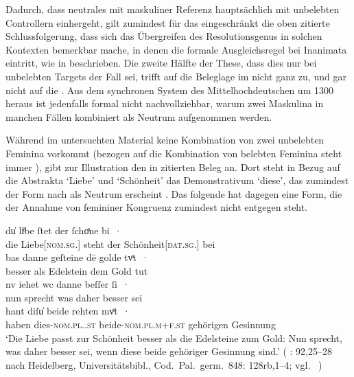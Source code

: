 Dadurch, dass neutrales  mit maskuliner Referenz hauptsächlich mit
unbelebten Controllern einhergeht, gilt zumindest für das \CAO{}
eingeschränkt die oben zitierte Schlussfolgerung, dass sich das Übergreifen des
Resolutionsgenus in solchen Kontexten bemerkbar mache, in
denen die formale Ausgleichsregel bei Inanimata eintritt, wie in
 beschrieben. Die zweite Hälfte der These, dass dies nur
bei unbelebten Targets der Fall sei, trifft auf die Beleglage im \CAO{} nicht
ganz zu, und gar nicht auf die \KC{}. Aus dem synchronen System des
Mittelhochdeutschen um 1300 heraus ist jedenfalls formal
nicht nachvollziehbar, warum zwei Maskulina in manchen Fällen kombiniert als
Neutrum aufgenommen werden.

Während im untersuchten Material keine Kombination von zwei unbelebten Feminina
vorkommt (bezogen auf die Kombination von belebten Feminina steht
immer ), gibt \citet[384]{paul2007} zur Illustration den in
 zitierten Beleg an. Dort steht in Bezug auf die
Abstrakta  `Liebe' und  `Schönheit' das
Demonstrativum
 `diese', das zumindest der Form nach als Neutrum erscheint
\autocite[485]{ksw2}. Das folgende  hat dagegen eine Form, die der
Annahme von femininer Kongruenz zumindest nicht entgegen steht.

\begin{exe}
\ex\label{ex:walther92_25-28_C_2}
	\gll du̍ liͤbe ſtet der ſchoͤne bi~· \\
			die Liebe[\textsc{nom.sg.\FemI}] steht der
			Schönheit[\textsc{dat.sg.\FemI}] bei \\
\sn \gll bas danne geſteine dē golde tvͦt~· \\
		besser als Edelstein dem Gold tut \\
\sn \gll nv iehet wc danne beſſer ſi~· \\
		nun sprecht was daher besser sei \\
\sn \gll hant diſu̍ beide rehten mvͦt~· \\
		haben dies-\textsc{nom.pl.\NeutI.st} beide-\textsc{nom.pl.m+f\subI.st}
			gehörigen Gesinnung \\
	\trans `Die Liebe passt zur Schönheit besser als die Edelsteine zum
		Gold: Nun sprecht, was daher besser sei, wenn diese beide gehöriger
		Gesinnung sind.'
		(%
			: 92,25--28 nach
			Heidelberg, Universitätsbibl., Cod.~Pal.~germ.~848: 128rb,1--4;
			vgl.~\cite[356--358]{bein2013}%
		)
	\\
\end{exe}

